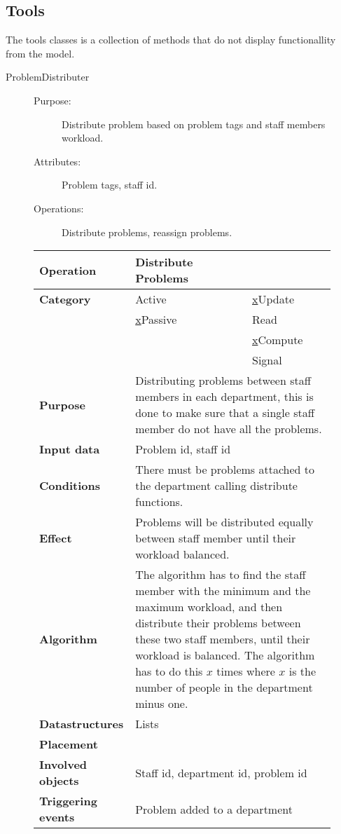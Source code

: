 \subsection{Tools}


The tools classes is a collection of methods that do not display functionallity from the model.

\begin{description}
\item[ProblemDistributer]\hfill
\begin{description}
\item[Purpose:]Distribute problem based on problem tags and staff members workload.
\item[Attributes:]Problem tags, staff id.
\item[Operations:]Distribute problems, reassign problems.
\end{description}
\end{description}

\begin{figure}
\begin{tabular}{p{3.5cm} p{4cm} p{4cm}}
\hline
\textbf{Operation}&Distribute Problems\\
\hline
\textbf{Category}&\underline{ }Active&\underline{x}Update\\
&\underline{x}Passive&\underline{ }Read\\
&&\underline{x}Compute\\
&&\underline{ }Signal\\
\textbf{Purpose}&\multicolumn{2}{p{8cm}}{Distributing problems between staff members in each department, this is done to make sure that a single staff member do not have all the problems.}\\
\textbf{Input data}&\multicolumn{2}{p{8cm}}{Problem id, staff id}\\
\textbf{Conditions}&\multicolumn{2}{p{8cm}}{There must be problems attached to the department calling distribute functions.}\\
\textbf{Effect}&\multicolumn{2}{p{8cm}}{Problems will be distributed equally between staff member until their workload balanced.}\\
\textbf{Algorithm}&\multicolumn{2}{p{8cm}}{The algorithm has to find the staff member with the minimum and the maximum workload, and then distribute their problems between these two staff members, until their workload is balanced. The algorithm has to do this $x$ times where $x$ is the number of people in the department minus one.}\\
\textbf{Datastructures}&\multicolumn{2}{p{8cm}}{Lists}\\
\textbf{Placement}&\multicolumn{2}{p{8cm}}{}\\
\textbf{Involved objects}&\multicolumn{2}{p{8cm}}{Staff id, department id, problem id}\\
\textbf{Triggering events}&\multicolumn{2}{p{8cm}}{Problem added to a department}\\
\hline
\end{tabular}
\end{figure}

